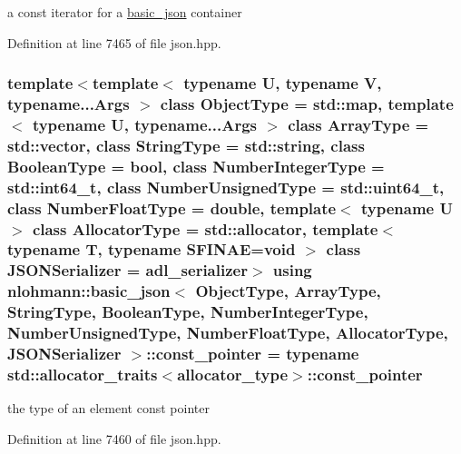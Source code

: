 a const iterator for a \hyperlink{classnlohmann_1_1basic__json}{basic\+\_\+json} container 



Definition at line 7465 of file json.\+hpp.

\subsubsection[{\texorpdfstring{const\+\_\+pointer}{const_pointer}}]{\setlength{\rightskip}{0pt plus 5cm}template$<$template$<$ typename U, typename V, typename...\+Args $>$ class Object\+Type = std\+::map, template$<$ typename U, typename...\+Args $>$ class Array\+Type = std\+::vector, class String\+Type  = std\+::string, class Boolean\+Type  = bool, class Number\+Integer\+Type  = std\+::int64\+\_\+t, class Number\+Unsigned\+Type  = std\+::uint64\+\_\+t, class Number\+Float\+Type  = double, template$<$ typename U $>$ class Allocator\+Type = std\+::allocator, template$<$ typename T, typename S\+F\+I\+N\+A\+E=void $>$ class J\+S\+O\+N\+Serializer = adl\+\_\+serializer$>$ using {\bf nlohmann\+::basic\+\_\+json}$<$ Object\+Type, Array\+Type, String\+Type, Boolean\+Type, Number\+Integer\+Type, Number\+Unsigned\+Type, Number\+Float\+Type, Allocator\+Type, J\+S\+O\+N\+Serializer $>$\+::{\bf const\+\_\+pointer} =  typename std\+::allocator\+\_\+traits$<${\bf allocator\+\_\+type}$>$\+::{\bf const\+\_\+pointer}}\hypertarget{classnlohmann_1_1basic__json_aff3d5cd2a75612364b888d8693231b58}{}\label{classnlohmann_1_1basic__json_aff3d5cd2a75612364b888d8693231b58}


the type of an element const pointer 



Definition at line 7460 of file json.\+hpp.

